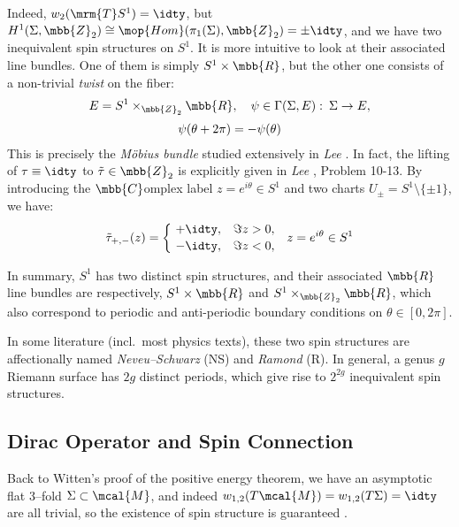 \documentclass[a4paper,11pt]{article}
\begin{document}
	Indeed, $w_2(\mrm{T}S^1) = \idty$, but $H^1(\Sigma,\mbb{Z}_2)\cong \mop{Hom}(\pi_1(\Sigma),\mbb{Z}_2) = {\pm\idty}$, and we have two inequivalent spin structures on $S^1$. It is more intuitive to look at their associated line bundles. One of them is simply $S^1\times\mbb{R}$, but the other one consists of a non-trivial \textit{twist} on the fiber:
	\begin{equation}
	\begin{gathered}
		E = S^1\times_{\mbb{Z}_2} \mbb{R},\quad
		\psi\in \Gamma(\Sigma,E)
			\,\colon\,
			\Sigma\to E,\\[.5ex]
		\psi(\theta + 2\pi) = -\psi(\theta)
	\end{gathered}
	\end{equation}
	This is precisely the \textit{M\"obius bundle} studied extensively in \textit{Lee} \cite{lee2012introduction}. In fact, the lifting of $\tau\equiv\idty$ to $\tilde{\tau}\in\mbb{Z}_2$ is explicitly given in \textit{Lee} \cite{lee2012introduction}, Problem 10-13. By introducing the $\mbb{C}$omplex label $z = e^{i\theta} \in {S}^1$ and two charts $U_{\pm} = S^1\setminus\{\pm 1\}$, we have:
	\begin{equation}
		\tilde{\tau}_{+,-}(z)
		= \bigg\lbrace
		\begin{aligned}
			\ %
			& {+\idty}, && \Im z > 0,\\[-.3ex]
			& {-\idty}, && \Im z < 0,
		\end{aligned}\quad
		z = e^{i\theta} \in S^1
	\end{equation}
	
	In summary, $S^1$ has two distinct spin structures, and their associated $\mbb{R}$ line bundles are respectively, $S^1 \times\mbb{R}$ and $S^1\times_{\mbb{Z}_2} \mbb{R}$, which also correspond to periodic and anti-periodic boundary conditions on $\theta\in[0,2\pi]$. 
	
	In some literature (incl.~most physics texts), these two spin structures are affectionally named \textit{Neveu--Schwarz} (NS) and \textit{Ramond} (R). In general, a genus $g$ Riemann surface has $2g$ distinct periods, which give rise to $2^{2g}$ inequivalent spin structures. 
\subsection{Dirac Operator and Spin Connection}
	Back to Witten's proof of the positive energy theorem, we have an asymptotic flat 3--fold $\Sigma\subset\mcal{M}$, and indeed $w_{1,2}(T\mcal{M}) = w_{1,2}(T\Sigma) = \idty$ are all trivial, so the existence of spin structure is guaranteed \cite{Parker:1981uy}. 
	
\end{document}
